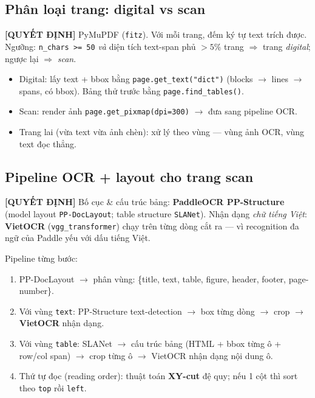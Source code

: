 \documentclass[11pt,a4paper]{article}
\newcommand{\dec}[1]{\textbf{\color{fsgreen!60!black}[QUYẾT ĐỊNH]} #1}
\begin{document}
\subsection{Phân loại trang: digital vs scan}
\begin{quyetdinh}
\dec{} PyMuPDF (\texttt{fitz}). Với mỗi trang, đếm ký tự text trích được. Ngưỡng: \texttt{n\_chars >= 50} \emph{và} diện tích text-span phủ $> 5\%$ trang $\Rightarrow$ trang \emph{digital}; ngược lại $\Rightarrow$ \emph{scan}.
\end{quyetdinh}
\begin{itemize}
  \item Digital: lấy text + bbox bằng \texttt{page.get\_text("dict")} (blocks $\rightarrow$ lines $\rightarrow$ spans, có bbox). Bảng thử trước bằng \texttt{page.find\_tables()}.
  \item Scan: render ảnh \texttt{page.get\_pixmap(dpi=300)} $\rightarrow$ đưa sang pipeline OCR.
  \item Trang lai (vừa text vừa ảnh chèn): xử lý theo vùng --- vùng ảnh OCR, vùng text đọc thẳng.
\end{itemize}

\subsection{Pipeline OCR + layout cho trang scan}
\begin{quyetdinh}
\dec{} Bố cục \& cấu trúc bảng: \textbf{PaddleOCR PP-Structure} (model layout \texttt{PP-DocLayout}; table structure \texttt{SLANet}). Nhận dạng \emph{chữ tiếng Việt}: \textbf{VietOCR} (\texttt{vgg\_transformer}) chạy trên từng dòng cắt ra --- vì recognition đa ngữ của Paddle yếu với dấu tiếng Việt.
\end{quyetdinh}

Pipeline từng bước:
\begin{enumerate}
  \item PP-DocLayout $\rightarrow$ phân vùng: \{title, text, table, figure, header, footer, page-number\}.
  \item Với vùng \texttt{text}: PP-Structure text-detection $\rightarrow$ box từng dòng $\rightarrow$ crop $\rightarrow$ \textbf{VietOCR} nhận dạng.
  \item Với vùng \texttt{table}: SLANet $\rightarrow$ cấu trúc bảng (HTML + bbox từng ô + row/col span) $\rightarrow$ crop từng ô $\rightarrow$ VietOCR nhận dạng nội dung ô.
  \item Thứ tự đọc (reading order): thuật toán \textbf{XY-cut} đệ quy; nếu 1 cột thì sort theo \texttt{top} rồi \texttt{left}.
\end{enumerate}
\end{document}
